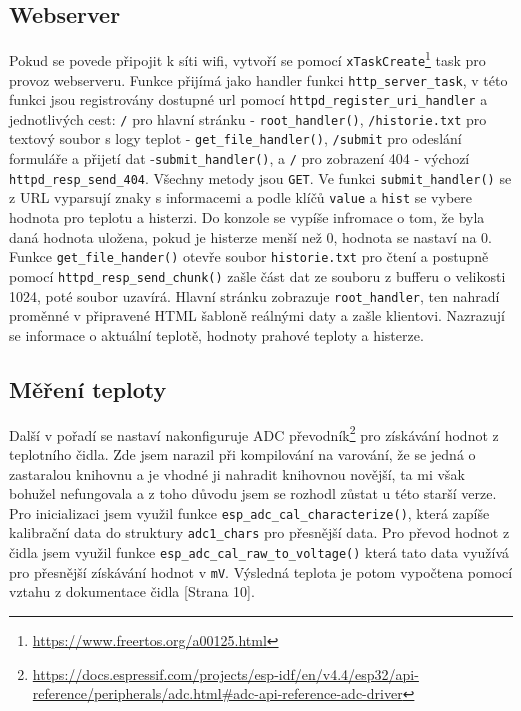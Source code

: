 \documentclass[a4paper, 11pt]{article}
\begin{document}
 \subsection{Webserver}
 Pokud se povede připojit k síti wifi, vytvoří se pomocí \texttt{xTaskCreate}\footnote{\url{https://www.freertos.org/a00125.html}} task pro provoz webserveru. Funkce přijímá jako handler funkci \texttt{http\_server\_task}, v této funkci jsou registrovány dostupné url pomocí \texttt{httpd\_register\_uri\_handler} a jednotlivých cest: \texttt{/} pro hlavní stránku - \texttt{root\_handler()}, \texttt{/historie.txt} pro textový soubor s logy teplot - \texttt{get\_file\_handler()}, \texttt{/submit} pro odeslání formuláře a přijetí dat -\texttt{submit\_handler()}, a \texttt{/\*} pro zobrazení 404 - výchozí \texttt{httpd\_resp\_send\_404}. Všechny metody jsou \texttt{GET}. Ve funkci \texttt{submit\_handler()} se z URL vyparsují znaky s informacemi a podle klíčů \texttt{value} a \texttt{hist} se vybere hodnota pro teplotu a histerzi. Do konzole se vypíše infromace o tom, že byla daná hodnota uložena, pokud je histerze menší než 0, hodnota se nastaví na 0. Funkce \texttt{get\_file\_hander()} otevře soubor \texttt{historie.txt} pro čtení a postupně pomocí \texttt{httpd\_resp\_send\_chunk()} zašle část dat ze souboru z bufferu o velikosti 1024, poté soubor uzavírá. Hlavní stránku zobrazuje \texttt{root\_handler}, ten nahradí proměnné v připravené HTML šabloně reálnými daty a zašle klientovi. Nazrazují se informace o aktuální teplotě, hodnoty prahové teploty a histerze.


\subsection{Měření teploty}
Další v pořadí se nastaví nakonfiguruje ADC převodník\footnote{\url{https://docs.espressif.com/projects/esp-idf/en/v4.4/esp32/api-reference/peripherals/adc.html#adc-api-reference-adc-driver}} pro získávání hodnot z teplotního čidla. Zde jsem narazil při kompilování na varování, že se jedná o zastaralou knihovnu a je vhodné ji nahradit knihovnou novější, ta mi však bohužel nefungovala a z toho důvodu jsem se rozhodl zůstat u této starší verze. Pro inicializaci jsem využil funkce \texttt{esp\_adc\_cal\_characterize()}, která zapíše kalibrační data do struktury \texttt{adc1\_chars} pro přesnější data. Pro převod hodnot z čidla jsem využil funkce \texttt{esp\_adc\_cal\_raw\_to\_voltage()} která tato data využívá pro přesnější získávání hodnot v \texttt{mV}. Výsledná teplota je potom vypočtena pomocí vztahu z dokumentace čidla \cite{cidloMan}[Strana 10].
\end{document}
